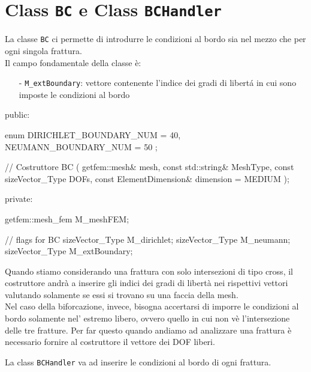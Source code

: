 \section{Class \texttt{BC} e Class \texttt{BCHandler}}
La classe \texttt{BC} ci permette di introdurre le condizioni al bordo sia nel mezzo che per ogni singola frattura. \\ 
Il campo fondamentale della classe \`{e}:
	\begin{enumerate}
	\item[-] \texttt{M\_extBoundary}: vettore contenente l'indice dei gradi di libert\'{a} in cui sono imposte le condizioni al bordo
	\end{enumerate} 

\begin{Code03_03}[caption={Classe \texttt{BC}}]
public:

    enum
    {
        DIRICHLET_BOUNDARY_NUM = 40,
        NEUMANN_BOUNDARY_NUM = 50
    };

    // Costruttore
    BC ( getfem::mesh& mesh,
         const std::string& MeshType,
         const sizeVector_Type DOFs,
         const ElementDimension& dimension = MEDIUM );

private:

    getfem::mesh_fem M_meshFEM;
    
    // flags for BC
    sizeVector_Type M_dirichlet;
    sizeVector_Type M_neumann;
    sizeVector_Type M_extBoundary;
\end{Code03_03}

Quando stiamo considerando una frattura con solo intersezioni di tipo cross, il costruttore andrà a inserire gli indici dei gradi di libert\`{a} nei rispettivi vettori valutando solamente se essi si trovano su una faccia della mesh.\\
Nel caso della biforcazione, invece, bisogna accertarsi di imporre le condizioni al bordo solamente nel' estremo libero, ovvero quello in cui non v\`{e} l'intersezione delle tre fratture.
%
Per far questo quando andiamo ad analizzare una frattura \`{e} necessario fornire al costruttore il vettore dei DOF liberi.

La class \texttt{BCHandler} va ad inserire le condizioni al bordo di ogni frattura.

